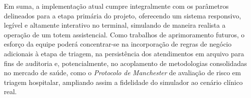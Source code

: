 \documentclass[12pt,a4paper]{article}
\begin{document}
Em suma, a implementação atual cumpre integralmente com os parâmetros delineados para a etapa primária do projeto, oferecendo um sistema responsivo, legível e altamente interativo no terminal, simulando de maneira realista a operação de um totem assistencial. Como trabalhos de aprimoramento futuros, o esforço da equipe poderá concentrar-se na incorporação de regras de negócio adicionais à etapa de triagem, na persistência dos atendimentos em arquivo para fins de auditoria e, potencialmente, no acoplamento de metodologias consolidadas no mercado de saúde, como o \textit{Protocolo de Manchester} de avaliação de risco em triagem hospitalar, ampliando assim a fidelidade do simulador ao cenário clínico real.
\end{document}
